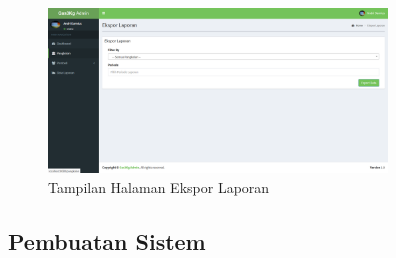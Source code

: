 	\begin{figure}[H]
		\center
		\includegraphics [width = 9cm]{gambar/web/Laporan}
		\caption{Tampilan Halaman Ekspor Laporan}
		\label{tampilanLaporanAgen}
	\end{figure}
	
	
	
	\subsection{Pembuatan Sistem}
	
